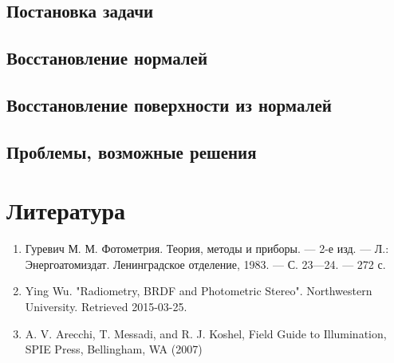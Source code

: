 \documentclass[12pt]{article}
\begin{document}
\subsection{Постановка задачи}



\subsection{Восстановление нормалей}
\subsection{Восстановление поверхности из нормалей}
\subsection{Проблемы, возможные решения}

\section{Литература}
\begin{enumerate}
  \item Гуревич М. М. Фотометрия. Теория, методы и приборы. — 2-е изд. — Л.: Энергоатомиздат. Ленинградское отделение, 1983. — С. 23—24. — 272 с.
  \item Ying Wu. "Radiometry, BRDF and Photometric Stereo". Northwestern University. Retrieved 2015-03-25.
  \item A. V. Arecchi, T. Messadi, and R. J. Koshel, Field Guide to Illumination, SPIE Press, Bellingham, WA (2007)
\end{enumerate}
\end{document}
